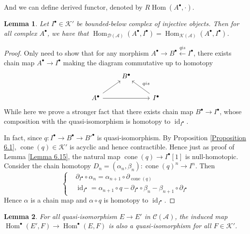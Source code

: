 \documentclass{ctexart}
\newtheorem{lemma}{Lemma}[section]
\renewcommand{\hom}{\operatorname{Hom}}
\newcommand{\identity}{\operatorname{id}}
\newcommand{\cone}{\operatorname{cone}}
\begin{document}
And we can define derived functor, denoted by $R\hom(A^{\bullet}, \cdot)$.
\begin{lemma}
    Let $I^{\bullet}\in \mathcal{K}'$ be bounded-below complex of injective objects.
    Then for all complex $A^{\bullet}$, we have that $\hom_{\mathcal{D}(\mathscr{A})}(A^{\bullet}, I^{\bullet}) = \hom_{\mathcal{K}(\mathscr{A})}(A^{\bullet}, I^{\bullet})$.
    \label{Lemma 6.16}
\end{lemma}
\begin{proof}
    Only need to show that for any morphism $A^{\bullet} \rightarrow B^{\bullet} \overset{qis}{\leftarrow} I^{\bullet}$,
    there exists chain map $A^{\bullet} \rightarrow I^{\bullet}$ making the diagram commutative up to homotopy
    \begin{equation}
        \begin{tikzcd}
            & B^{\bullet} & \\
            A^{\bullet} \arrow[ur] \arrow[rr] &&
            I^{\bullet} \arrow[ul, "qis" swap]
        \end{tikzcd}
    \end{equation}
    While here we prove a stronger fact that there exists chain map $B^{\bullet} \rightarrow I^{\bullet}$,
    whose composition with the quasi-isomorphism is homotopy to $\identity_{I^{\bullet}}$.
    \par
    In fact, since $q: I^{\bullet} \rightarrow B^{\bullet} \rightarrow B'^{\bullet}$ is quasi-isomorphism.
    By Proposition \ref{Proposition 6.1}, $\cone(q)\in \mathcal{K}'$ is acyclic and hence contractible.
    Hence just as proof of Lemma \ref{Lemma 6.15}, the natural map $\cone(q) \rightarrow I^{\bullet}[1]$ is null-homotopic.
    Consider the chain homotopy $D_{n} = (\alpha_{n}, \beta_{n}): \cone(q)^{n} \rightarrow I^{n}$.
    Then 
    \begin{equation}
        \left\{
            \begin{aligned}
                & \partial_{I^{\bullet}} \circ \alpha_{n} = \alpha_{n + 1} \circ \partial_{\cone(q)} \\
                & \identity_{I^{\bullet}} = \alpha_{n + 1} \circ q - \partial_{I^{\bullet}} \circ \beta_{n} - \beta_{n + 1} \circ \partial_{I^{\bullet}}
            \end{aligned}
        \right.
    \end{equation}
    Hence $\alpha$ is a chain map and $\alpha \circ q$ is homotopy to $\identity_{I^{\bullet}}$.
\end{proof}
\begin{lemma}
    For all quasi-isomorphism $E \rightarrow E'$ in $\mathcal{C}(\mathscr{A})$,
    the induced map $\hom^{\bullet}(E', F) \rightarrow \hom^{\bullet}(E, F)$ is also a quasi-isomorphism for all $F\in \mathcal{K}'$.
    \label{Lemma 6.17}
\end{lemma}
\end{document}

